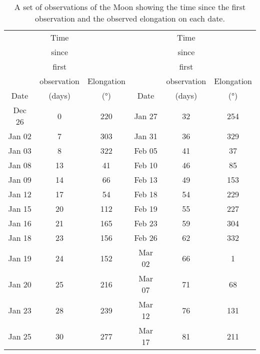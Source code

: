 \documentclass{exam}
\begin{document}
\begin{table}[!h]
\centering
\begin{tabular}{|c|c|c||c|c|c|}
\hline
 		& Time 			&   			&  		& Time 			&   			\\
 		& since 		&   			&  		& since 		&   			\\
 		& first  		&   			&  		& first  		&   			\\
 		& observation  	& Elongation  	&  		& observation  	& Elongation  	\\
Date 	& (days) 		& (°)  			& Date 	& (days) 		& (°)  			\\
\hline
Dec 26 & 0 & 220 & Jan 27 & 32 & 254 \\
Jan 02 & 7 & 303 & Jan 31 & 36 & 329 \\
Jan 03 & 8 & 322 & Feb 05 & 41 & 37 \\
Jan 08 & 13 & 41 & Feb 10 & 46 & 85 \\
Jan 09 & 14 & 66 & Feb 13 & 49 & 153 \\
Jan 12 & 17 & 54 & Feb 18 & 54 & 229 \\
Jan 15 & 20 & 112 & Feb 19 & 55 & 227 \\
Jan 16 & 21 & 165 & Feb 23 & 59 & 304 \\
Jan 18 & 23 & 156 & Feb 26 & 62 & 332 \\
Jan 19 & 24 & 152 & Mar 02 & 66 & 1 \\
Jan 20 & 25 & 216 & Mar 07 & 71 & 68 \\
Jan 23 & 28 & 239 & Mar 12 & 76 & 131 \\
Jan 25 & 30 & 277 & Mar 17 & 81 & 211 \\
\hline
\end{tabular}\\
\caption{\label{Tab:elongation}A set of observations of the Moon showing the time since the first observation and the observed elongation on each date.}
\end{table}
\end{document}

